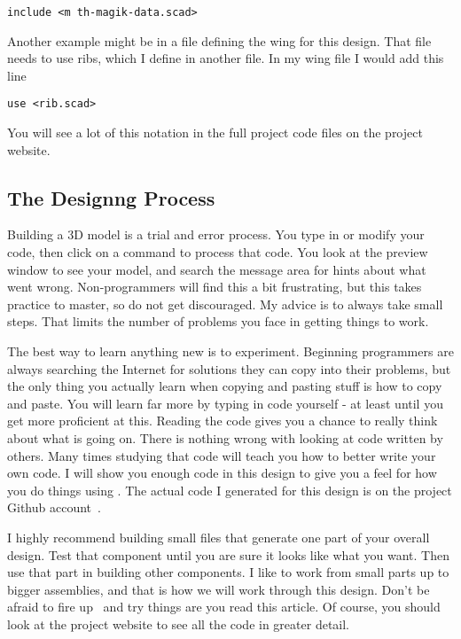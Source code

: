 \begin{lstlisting}
include <m th-magik-data.scad>
\end{lstlisting}

Another example might be in a file defining the wing for this design. That file
needs to use ribs, which I define in another file. In my wing file I would
add this line

\begin{lstlisting}
use <rib.scad>
\end{lstlisting}

You will see a lot of this notation in the full project code files on the
project website.

\subsection{The Designng Process}

Building a 3D model is a trial and error process. You type in or modify your
code, then click on a command to process that code. You look at the preview
window to see your model, and search the message area for hints about what went
wrong.  Non-programmers will find this a bit frustrating, but this takes
practice to master, so do not get discouraged. My advice is to always take
small steps.  That limits the number of problems you face in getting things to
work.

The best way to learn anything new is to experiment. Beginning programmers are
always searching the Internet for solutions they can copy into their problems,
but the only thing you actually learn when copying and pasting stuff is how to
copy and paste. You will learn far more by typing in code yourself - at least
until you get more proficient at this. Reading the code gives you a chance to
really think about what is going on. There is nothing wrong with looking at
code written by others. Many times studying that code will teach you how to
better write your own code. I will show you enough code in this design to give
you a feel for how you do things using \osc. The actual code I generated for
this design is on the project Github account~\cite{blackr}.

I highly recommend building small files that generate one part of your overall
design. Test that component until you are sure it looks like what you want.
Then use that part in building other components. I like to work from small
parts up to bigger assemblies, and that is how we will work through this
design. Don't be afraid to fire up \osc\ and try things are you read this
article. Of course, you should look at the project website to see all the code
in greater detail.

